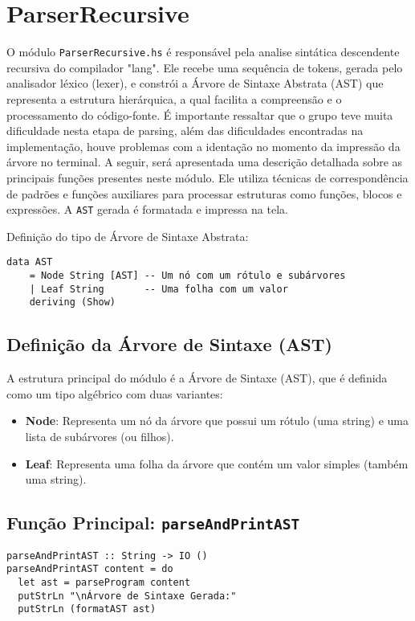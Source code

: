 \documentclass{article}
\begin{document}
\section{ParserRecursive}
O módulo \texttt{ParserRecursive.hs} é responsável pela analise sintática descendente recursiva do compilador "lang". Ele recebe uma sequência de tokens, gerada pelo analisador léxico (lexer), e constrói a Árvore de Sintaxe Abstrata (AST) que representa a estrutura hierárquica, a qual facilita a compreensão e o processamento do código-fonte. É importante ressaltar que o grupo teve muita dificuldade nesta etapa de parsing, além das dificuldades encontradas na implementação, houve problemas com a identação no momento da impressão da árvore no terminal.
A seguir, será apresentada uma descrição detalhada sobre as principais funções presentes neste módulo. Ele utiliza técnicas de correspondência de padrões e funções auxiliares para processar estruturas como funções, blocos e expressões. A \texttt{AST} gerada é formatada e impressa na tela.

Definição do tipo de Árvore de Sintaxe Abstrata:

\begin{verbatim}
data AST
    = Node String [AST] -- Um nó com um rótulo e subárvores
    | Leaf String       -- Uma folha com um valor
    deriving (Show)
\end{verbatim} 

\subsection{Definição da Árvore de Sintaxe (AST)}

A estrutura principal do módulo é a Árvore de Sintaxe (AST), que é definida como um tipo algébrico com duas variantes:

\begin{itemize}
    \item \textbf{Node}: Representa um nó da árvore que possui um rótulo (uma string) e uma lista de subárvores (ou filhos). 
    \item \textbf{Leaf}: Representa uma folha da árvore que contém um valor simples (também uma string).
\end{itemize}

\subsection{Função Principal: \texttt{parseAndPrintAST}}
\begin{verbatim}
parseAndPrintAST :: String -> IO ()
parseAndPrintAST content = do
  let ast = parseProgram content
  putStrLn "\nÁrvore de Sintaxe Gerada:"
  putStrLn (formatAST ast)
\end{verbatim}
\end{document}
